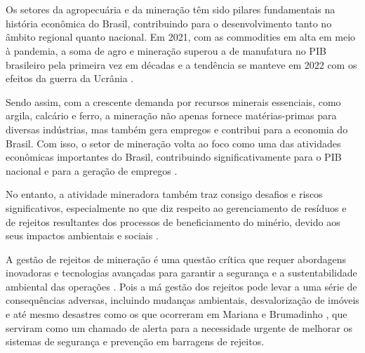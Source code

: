 \chapter*{}
\noindent
{}



\vspace{1.4cm}

Os setores da agropecuária e da mineração têm sido pilares fundamentais na história econômica do Brasil, contribuindo para o desenvolvimento tanto no âmbito regional quanto nacional. Em 2021, com as commodities em alta em meio à pandemia, a soma de agro e mineração superou a de manufatura no PIB brasileiro pela primeira vez em décadas e a tendência se manteve em 2022 com os efeitos da guerra da Ucrânia \cite{BBC2023}.

Sendo assim, com a crescente demanda por recursos minerais essenciais, como argila, calcário e ferro, a mineração não apenas fornece matérias-primas para diversas indústrias, mas também gera empregos e contribui para a economia do Brasil. Com isso, o setor de mineração volta ao foco como uma das atividades econômicas importantes do Brasil, contribuindo significativamente para o PIB nacional e para a geração de empregos \cite{ibram2020tecnologias}.

No entanto, a atividade mineradora também traz consigo desafios e riscos significativos, especialmente no que diz respeito ao gerenciamento de resíduos e de rejeitos resultantes dos processos de beneficiamento do minério, devido aos seus impactos ambientais e sociais \cite{ipea2017boletim}.

A gestão de rejeitos de mineração é uma questão crítica que requer abordagens inovadoras e tecnologias avançadas para garantir a segurança e a sustentabilidade ambiental das operações \cite{ibram2020tecnologias}. Pois a má gestão dos rejeitos pode levar a uma série de consequências adversas, incluindo mudanças ambientais, desvalorização de imóveis e até mesmo desastres como os que ocorreram em Mariana e Brumadinho \cite{ipea2017boletim}, que serviram como um chamado de alerta para a necessidade urgente de melhorar os sistemas de segurança e prevenção em barragens de rejeitos.

